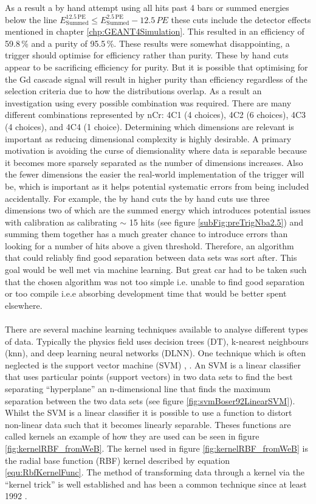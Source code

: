 As a result a by hand attempt using all hits past 4 bars or summed energies below the line $E^{12.5\,\textrm{PE}}_\textrm{Summed} \leq E^{2.5\,\textrm{PE}}_\textrm{Summed} - 12.5\,PE$ these cuts include the detector effects mentioned in chapter \ref{chp:GEANT4Simulation}. This resulted in an efficiency of 59.8\,\% and a purity of 95.5\,\%. These results were somewhat disappointing, a trigger should optimise for efficiency rather than purity. These by hand cuts appear to be sacrificing efficiency for purity. But it is possible that optimising for the Gd cascade signal will result in higher purity than efficiency regardless of the selection criteria due to how the distributions overlap. As a result an investigation using every possible combination was required. There are many different combinations represented by nCr: 4C1 (4 choices), 4C2 (6 choices), 4C3 (4 choices), and 4C4 (1 choice). Determining which dimensions are relevant is important as reducing dimensional complexity is highly desirable. A primary motivation is avoiding the curse of diemsionality where data is separable because it becomes more sparsely separated as the number of dimensions increases. Also the fewer dimensions the easier the real-world implementation of the trigger will be, which is important as it helps potential systematic errors from being included accidentally. For example, the by hand cuts the by hand cuts use three dimensions two of which are the summed energy which introduces potential issues with calibration as calibrating $\sim$ 15 hits (see figure \ref{subFig:preTrigNba2.5}) and summing them together has a much greater chance to introduce errors than looking for a number of hits above a given threshold. Therefore, an algorithm that could reliably find good separation between data sets was sort after. This goal would be well met via machine learning. But great car had to be taken such that the chosen algorithm was not too simple i.e. unable to find good separation or too compile i.e.e absorbing development time that would be better spent elsewhere. 
\\\\There are several machine learning techniques available to analyse different types of data. Typically the physics field uses decision trees (DT), k-nearest neighbours (knn), and deep learning neural networks (DLNN). One technique which is often neglected is the support vector machine (SVM) \cite{Boser92atraining}, \cite{cortes1995support}. An SVM is a linear classifier that uses particular points (support vectors) in two data sets to find the best separating ``hyperplane'' an n-dimensional line that finds the maximum separation between the two data sets (see figure \ref{fig:svmBoser92LinearSVM}). Whilst the SVM is a linear classifier it is possible to use a function to distort non-linear data such that it becomes linearly separable. Theses functions are called kernels an example of how they are used can be seen in figure \ref{fig:kernelRBF_fromWeB}. The kernel used in figure \ref{fig:kernelRBF_fromWeB} is the radial base function (RBF) kernel described by equation \ref{equ:RbfKernelFunc}. The method of transforming data through a kernel via the ``kernel trick'' is well established and has been a common technique since at least 1992 \cite{Boser92atraining}.
